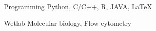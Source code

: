 

\begin{cvskills}

  \cvskill
  {Programming} %
  {Python, C/C++, R, JAVA, LaTeX} %

  \cvskill
  {Wetlab} %
  {Molecular biology, Flow cytometry} %


\end{cvskills}

